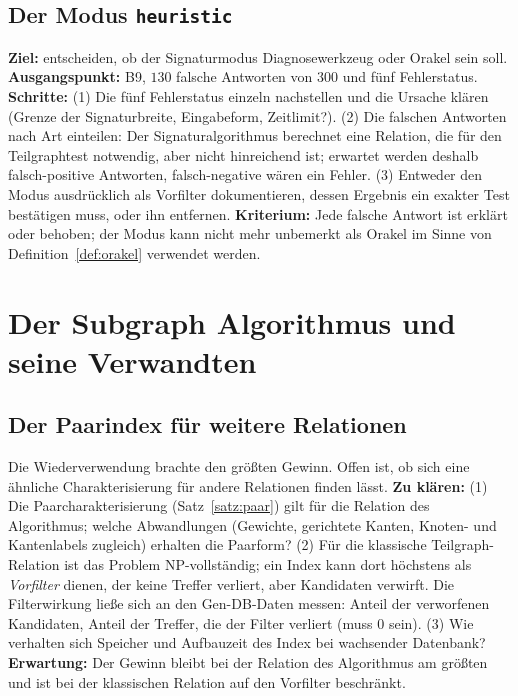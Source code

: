 \subsection{Der Modus \texttt{heuristic}}

\textbf{Ziel:} entscheiden, ob der Signaturmodus Diagnosewerkzeug oder Orakel sein soll. \textbf{Ausgangspunkt:} B9, $130$ falsche Antworten von $300$ und fünf Fehlerstatus. \textbf{Schritte:} (1) Die fünf Fehlerstatus einzeln nachstellen und die Ursache klären (Grenze der Signaturbreite, Eingabeform, Zeitlimit?). (2) Die falschen Antworten nach Art einteilen: Der Signaturalgorithmus berechnet eine Relation, die für den Teilgraphtest notwendig, aber nicht hinreichend ist; erwartet werden deshalb falsch-positive Antworten, falsch-negative wären ein Fehler. (3) Entweder den Modus ausdrücklich als Vorfilter dokumentieren, dessen Ergebnis ein exakter Test bestätigen muss, oder ihn entfernen. \textbf{Kriterium:} Jede falsche Antwort ist erklärt oder behoben; der Modus kann nicht mehr unbemerkt als Orakel im Sinne von Definition~\ref{def:orakel} verwendet werden.

\section{Der Subgraph Algorithmus und seine Verwandten}

\subsection{Der Paarindex für weitere Relationen}

Die Wiederverwendung  brachte den größten Gewinn. Offen ist, ob sich eine ähnliche Charakterisierung für andere Relationen finden lässt. \textbf{Zu klären:} (1) Die Paarcharakterisierung (Satz~\ref{satz:paar}) gilt für die Relation des Algorithmus; welche Abwandlungen (Gewichte, gerichtete Kanten, Knoten- und Kantenlabels zugleich) erhalten die Paarform? (2) Für die klassische Teilgraph-Relation ist das Problem NP-vollständig; ein Index kann dort höchstens als \emph{Vorfilter} dienen, der keine Treffer verliert, aber Kandidaten verwirft. Die Filterwirkung ließe sich an den Gen-DB-Daten messen: Anteil der verworfenen Kandidaten, Anteil der Treffer, die der Filter verliert (muss $0$ sein). (3) Wie verhalten sich Speicher und Aufbauzeit des Index bei wachsender Datenbank? \textbf{Erwartung:} Der Gewinn bleibt bei der Relation des Algorithmus am größten und ist bei der klassischen Relation auf den Vorfilter beschränkt.

